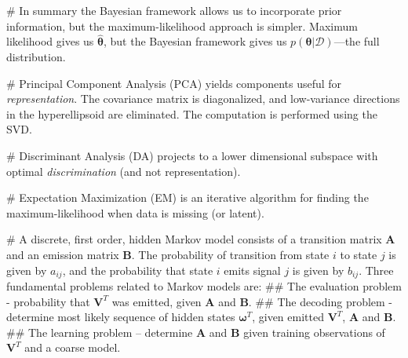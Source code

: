 \documentclass[12pt, a4paper]{article}
\newcommand{\D}{\mathcal{D}}
\newcommand{\vect}[1]{\bm{#1}}
\begin{document}
\begin{easylist}[itemize]
# In summary the Bayesian framework allows us to incorporate prior information, but the maximum-likelihood approach is simpler.
Maximum likelihood gives us $\hat{\vect{\theta}}$, but the Bayesian framework gives us $p(\vect{\theta} | \D)$---the full distribution.

# Principal Component Analysis (PCA) yields components useful for \emph{representation}.
The covariance matrix is diagonalized, and low-variance directions in the hyperellipsoid are eliminated.
The computation is performed using the SVD.

# Discriminant Analysis (DA) projects to a lower dimensional subspace with optimal \emph{discrimination} (and not representation).

# Expectation Maximization (EM) is an iterative algorithm for finding the maximum-likelihood when data is missing (or latent).

# A discrete, first order, hidden Markov model consists of a transition matrix $\vect{A}$ and an emission matrix $\vect{B}$.
The probability of transition from state $i$ to state $j$ is given by $a_{ij}$, and the probability that state $i$ emits signal $j$ is given by $b_{ij}$.
Three fundamental problems related to Markov models are:
## The evaluation problem - probability that $\vect{V}^T$ was emitted, given $\vect{A}$ and $\vect{B}$.
## The decoding problem - determine most likely sequence of hidden states $\vect{\omega}^T$, given emitted $\vect{V}^T$, $\vect{A}$ and $\vect{B}$.
## The learning problem -- determine $\vect{A}$ and $\vect{B}$ given training observations of $\vect{V}^T$ and a coarse model.

\end{easylist}
\end{document}
